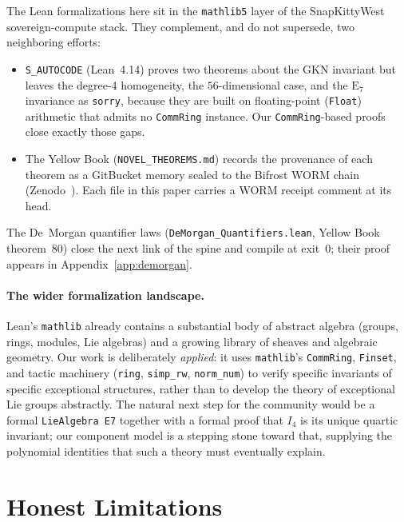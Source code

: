 \documentclass[11pt]{article}
\theoremstyle{definition}
\newcommand{\Iq}{I_4}
\begin{document}
The Lean formalizations here sit in the \texttt{mathlib5} layer of the
SnapKittyWest sovereign-compute stack. They complement, and do not supersede,
two neighboring efforts:
\begin{itemize}[leftmargin=2em]
\item \texttt{S\_AUTOCODE} (Lean~4.14) proves two theorems about the GKN
invariant but leaves the degree-4 homogeneity, the $56$-dimensional case, and
the $\mathrm{E}_7$ invariance as \texttt{sorry}, because they are built on
floating-point (\texttt{Float}) arithmetic that admits no \texttt{CommRing}
instance. Our \texttt{CommRing}-based proofs close exactly those gaps.
\item The Yellow Book (\texttt{NOVEL\_THEOREMS.md}) records the provenance of
each theorem as a GitBucket memory sealed to the Bifrost WORM chain
(Zenodo~\cite{zenodo}). Each file in this paper carries a WORM receipt comment
at its head.
\end{itemize}
The De~Morgan quantifier laws (\texttt{DeMorgan\_Quantifiers.lean}, Yellow
Book theorem~80) close the next link of the spine and compile at exit~0; their
proof appears in Appendix~\ref{app:demorgan}.

\paragraph{The wider formalization landscape.}
Lean's \texttt{mathlib} already contains a substantial body of abstract algebra
(groups, rings, modules, Lie algebras) and a growing library of sheaves and
algebraic geometry. Our work is deliberately \emph{applied}: it uses
\texttt{mathlib}'s \texttt{CommRing}, \texttt{Finset}, and tactic machinery
(\texttt{ring}, \texttt{simp\_rw}, \texttt{norm\_num}) to verify specific
invariants of specific exceptional structures, rather than to develop the theory
of exceptional Lie groups abstractly. The natural next step for the community
would be a formal \texttt{LieAlgebra E7} together with a formal proof that
$\Iq$ is its unique quartic invariant; our component model is a stepping stone
toward that, supplying the polynomial identities that such a theory must
eventually explain.

\section{Honest Limitations}
\label{sec:limits}
\end{document}
